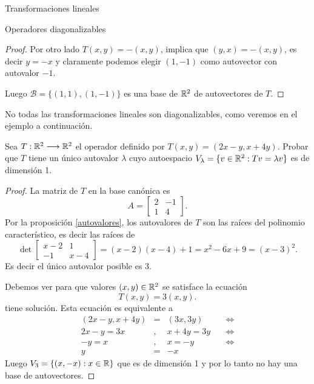 \begin{chapter}{Transformaciones lineales}
\begin{section}{Operadores diagonalizables}
\begin{proof}
            Por otro lado $T(x,y) = -(x,y)$, implica  que $(y,x)            = -(x,y)$, es decir $y = -x$ y claramente podemos elegir $(1,-1)$ como autovector con autovalor $-1$.
            
            Luego $\mathcal{B} = \{(1,1),(1,-1) \}$  es una base de $\mathbb R^2$ de autovectores de  $T$.
        \end{proof}
        
        No todas las transformaciones lineales son diagonalizables,  como veremos en el ejemplo a continuación. 
        
        
        \begin{ejemplo*}
            Sea $T:\mathbb R^2 \longrightarrow \mathbb R^2$ el operador definido por $T(x,y)=(2x-y,x+4y)$. Probar que $T$ tiene un único autovalor $\lambda$ cuyo autoespacio $V_\lambda=\{v\in \mathbb R^2: Tv=\lambda v\}$ es de dimensión 1.
        \end{ejemplo*}
        \begin{proof} La matriz de  $T$ en la base canónica es 
            $$
            A = \begin{bmatrix}
            2 & -1 \\ 1 & 4
            \end{bmatrix}. 
            $$
            Por la proposición \ref{autovalores}, los autovalores de $T$  son las raíces del polinomio característico,  es decir las raíces de 
            $$
            \det\left[\begin{matrix}
            x-2 & 1 \\ -1 & x-4
            \end{matrix} \right] = (x-2)(x-4)+1 = x^2 -6x + 9 = 
            (x -3)^2. 
            $$
            Es decir el  único autovalor posible es 3.
            
            Debemos ver para que valores  $(x,y)\in \mathbb R^2$ se satisface la ecuación
            $$
            T(x,y) = 3(x,y).
            $$
            tiene solución. Esta ecuación es equivalente a 
            \begin{equation*}
                \begin{array}{rcll}
                (2x-y,x+4y)&=&(3 x, 3 y)\quad &\Leftrightarrow \\
                2x-y = 3 x&,& x+4y = 3y \quad &\Leftrightarrow \\
                -y =  x&,& x = -y \quad &\Leftrightarrow \\
                y &=&  -x \quad &
                \end{array}
            \end{equation*}
            Luego $V_3 = \{(x,-x): x \in \mathbb R \}$ que es de dimensión 1 y por lo tanto no hay una base de autovectores.  	
            

\end{proof}
\end{section}
\end{chapter}
